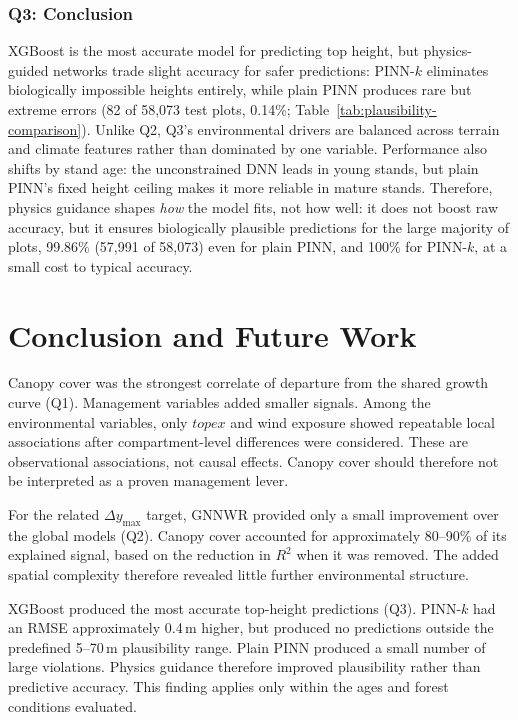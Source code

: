 \documentclass[logo,msc,ai]{infthesis}           %
\begin{document}
\subsection*{Q3: Conclusion}
XGBoost is the most accurate model for predicting top height, but physics-guided networks trade slight accuracy for safer predictions: PINN-$k$ eliminates biologically impossible heights entirely, while plain PINN produces rare but extreme errors (82 of 58,073 test plots, 0.14\%; Table~\ref{tab:plausibility-comparison}). Unlike Q2, Q3's environmental drivers are balanced across terrain and climate features rather than dominated by one variable. Performance also shifts by stand age: the unconstrained DNN leads in young stands, but plain PINN's fixed height ceiling makes it more reliable in mature stands. Therefore, physics guidance shapes \emph{how} the model fits, not how well: it does not boost raw accuracy, but it ensures biologically plausible predictions for the large majority of plots, 99.86\% (57,991 of 58,073) even for plain PINN, and 100\% for PINN-$k$, at a small cost to typical accuracy.





\chapter{Conclusion and Future Work}
\label{ch:conc}

Canopy cover was the strongest correlate of departure from the shared growth curve (Q1). Management variables added smaller signals. Among the environmental variables, only $\mathit{topex}$ and wind exposure showed repeatable local associations after compartment-level differences were considered. These are observational associations, not causal effects. Canopy cover should therefore not be interpreted as a proven management lever.

For the related $\Delta y_{\max}$ target, GNNWR provided only a small improvement over the global models (Q2). Canopy cover accounted for approximately 80--90\% of its explained signal, based on the reduction in $R^2$ when it was removed. The added spatial complexity therefore revealed little further environmental structure.

XGBoost produced the most accurate top-height predictions (Q3). PINN-$k$ had an RMSE approximately 0.4\,m higher, but produced no predictions outside the predefined 5--70\,m plausibility range. Plain PINN produced a small number of large violations. Physics guidance therefore improved plausibility rather than predictive accuracy. This finding applies only within the ages and forest conditions evaluated.
\end{document}
